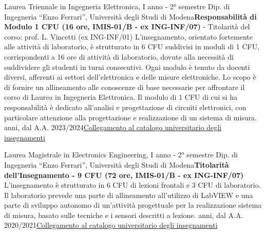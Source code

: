 {
{Laurea Triennale in Ingegneria Elettronica, I anno - 2° semestre}
{\newline  Dip. di Ingegneria “Enzo Ferrari'', Università degli Studi di Modena}{\newline \textbf{Responsabilità di Modulo 1 CFU (16 ore, IMIS-01/B - ex ING-INF/07)} - Titolarità del corso: prof. L. Vincetti (ex ING-INF/01)\newline
    L'insegnamento, orientato fortemente alle attività di laboratorio, è strutturato in 6 CFU suddivisi in moduli di 1 CFU, corrispondenti a 16 ore di attività di laboratorio, dovute alla necessità di suddividere gli studenti in turni consecutivi. Ogni modulo è tenuto da docenti diversi, afferenti ai settori dell'elettronica e delle misure elettroniche. Lo scopo è di fornire un allineamento alle conoscenze di base necessarie per affrontare il corso di Laurea in Ingegneria Elettronica. Il modulo di 1 CFU di cui si ha responsabilità è dedicato all'analisi e progettazione di circuiti elettronici, con particolare attenzione alla progettazione e realizzazione di un sistema di misura.  anni, dal A.A. 2023/2024}{\href{https://unimore.coursecatalogue.cineca.it/insegnamenti/2024/27909/2021/10000/10359?coorte=2024}{Collegamento al catalogo universitario degli insegnamenti}}

{Laurea Magistrale in Electronics Engineering, I anno - 2° semestre}
{\newline  Dip. di Ingegneria “Enzo Ferrari'', Università degli Studi di Modena}{\newline \textbf{Titolarità dell'Insegnamento - 9 CFU (72 ore, IMIS-01/B - ex ING-INF/07)}\newline
    L'insegnamento è strutturato in 6 CFU di lezioni frontali e 3 CFU di laboratorio. Il laboratorio prevede una parte di allineamento all'utilizzo di LabVIEW e una parte di sviluppo autonomo di un'attività progettuale per la realizzazione sistema di misura, basato sulle tecniche e i sensori descritti a lezione. anni, dal A.A. 2020/2021}{\href{https://unimore.coursecatalogue.cineca.it/insegnamenti/2024/27831/2024/10001/10858?coorte=2024}{Collegamento al catalogo universitario degli insegnamenti}}

}
